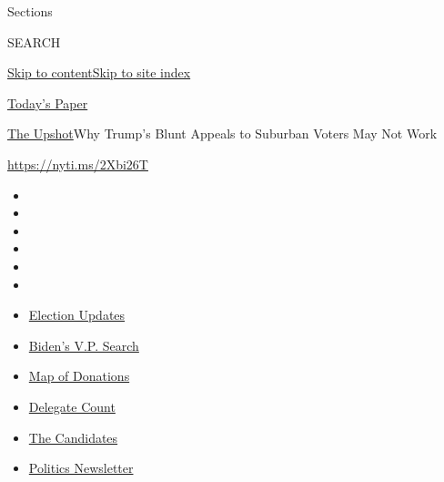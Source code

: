 Sections

SEARCH

\protect\hyperlink{site-content}{Skip to
content}\protect\hyperlink{site-index}{Skip to site index}

\href{https://myaccount.nytimes3xbfgragh.onion/auth/login?response_type=cookie\&client_id=vi}{}

\href{https://www.nytimes3xbfgragh.onion/section/todayspaper}{Today's
Paper}

\href{/section/upshot}{The Upshot}\textbar{}Why Trump's Blunt Appeals to
Suburban Voters May Not Work

\url{https://nyti.ms/2Xbi26T}

\begin{itemize}
\item
\item
\item
\item
\item
\item
\end{itemize}

\begin{itemize}
\item
  \href{https://www.nytimes3xbfgragh.onion/2020/08/04/us/elections/primary-election-michigan-arizona-kansas.html?action=click\&pgtype=Article\&state=default\&region=TOP_BANNER\&context=storylines_menu}{Election
  Updates}
\item
  \href{https://www.nytimes3xbfgragh.onion/article/biden-vice-president-2020.html?action=click\&pgtype=Article\&state=default\&region=TOP_BANNER\&context=storylines_menu}{Biden's
  V.P. Search}
\item
  \href{https://www.nytimes3xbfgragh.onion/interactive/2020/07/24/us/politics/trump-biden-campaign-donors.html?action=click\&pgtype=Article\&state=default\&region=TOP_BANNER\&context=storylines_menu}{Map
  of Donations}
\item
  \href{https://www.nytimes3xbfgragh.onion/interactive/2020/us/elections/delegate-count-primary-results.html?action=click\&pgtype=Article\&state=default\&region=TOP_BANNER\&context=storylines_menu}{Delegate
  Count}
\item
  \href{https://www.nytimes3xbfgragh.onion/interactive/2019/us/politics/2020-presidential-candidates.html?action=click\&pgtype=Article\&state=default\&region=TOP_BANNER\&context=storylines_menu}{The
  Candidates}
\item
  \href{https://www.nytimes3xbfgragh.onion/newsletters/politics?action=click\&pgtype=Article\&state=default\&region=TOP_BANNER\&context=storylines_menu}{Politics
  Newsletter}
\end{itemize}

